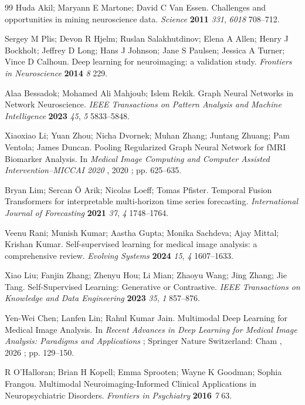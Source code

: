 \begin{thebibliography}{99}
Huda Akil; Maryann E Martone; David C Van Essen. Challenges and opportunities in mining neuroscience data. \textit{Science} \textbf{2011} \textit{331}, \textit{6018} 708--712.

Sergey M Plis; Devon R Hjelm; Ruslan Salakhutdinov; Elena A Allen; Henry J Bockholt; Jeffrey D Long; Hans J Johnson; Jane S Paulsen; Jessica A Turner; Vince D Calhoun. Deep learning for neuroimaging: a validation study. \textit{Frontiers in Neuroscience} \textbf{2014} \textit{8} 229.

Alaa Bessadok; Mohamed Ali Mahjoub; Islem Rekik. Graph Neural Networks in Network Neuroscience. \textit{IEEE Transactions on Pattern Analysis and Machine Intelligence} \textbf{2023} \textit{45}, \textit{5} 5833--5848.

Xiaoxiao Li; Yuan Zhou; Nicha Dvornek; Muhan Zhang; Juntang Zhuang; Pam Ventola; James Duncan. Pooling Regularized Graph Neural Network for fMRI Biomarker Analysis. In \textit{Medical Image Computing and Computer Assisted Intervention--MICCAI 2020} , 2020 ; pp. 625--635.

Bryan Lim; Sercan Ö Arik; Nicolas Loeff; Tomas Pfister. Temporal Fusion Transformers for interpretable multi-horizon time series forecasting. \textit{International Journal of Forecasting} \textbf{2021} \textit{37}, \textit{4} 1748--1764.

Veenu Rani; Munish Kumar; Aastha Gupta; Monika Sachdeva; Ajay Mittal; Krishan Kumar. Self-supervised learning for medical image analysis: a comprehensive review. \textit{Evolving Systems} \textbf{2024} \textit{15}, \textit{4} 1607--1633.

Xiao Liu; Fanjin Zhang; Zhenyu Hou; Li Mian; Zhaoyu Wang; Jing Zhang; Jie Tang. Self-Supervised Learning: Generative or Contrastive. \textit{IEEE Transactions on Knowledge and Data Engineering} \textbf{2023} \textit{35}, \textit{1} 857--876.

Yen-Wei Chen; Lanfen Lin; Rahul Kumar Jain. Multimodal Deep Learning for Medical Image Analysis. In \textit{Recent Advances in Deep Learning for Medical Image Analysis: Paradigms and Applications} ; Springer Nature Switzerland: Cham , 2026 ; pp. 129--150.

R O'Halloran; Brian H Kopell; Emma Sprooten; Wayne K Goodman; Sophia Frangou. Multimodal Neuroimaging-Informed Clinical Applications in Neuropsychiatric Disorders. \textit{Frontiers in Psychiatry} \textbf{2016} \textit{7} 63.


\end{thebibliography}
